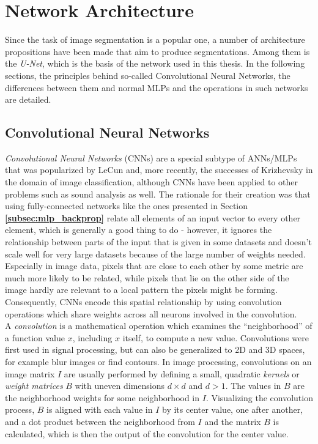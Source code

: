 \chapter {Network Architecture}
\label{chap:network}

Since the task of image segmentation is a popular one, a number of architecture propositions have been made that aim to produce segmentations. Among them is the \textit{U-Net}, which is the basis of the network used in this thesis.  In the following sections, the principles behind so-called Convolutional Neural Networks, the differences between them and normal MLPs and the operations in such networks are detailed.


	\section{Convolutional Neural Networks}
\label{sec:CNN}
\textit{Convolutional Neural Networks} (CNNs) are a special subtype of ANNs/MLPs that was popularized by LeCun \cite{lecun98} and, more recently, the successes of Krizhevsky \cite{krizhevsky2012} in the domain of image classification, although CNNs have been applied to other problems such as sound analysis as well. The rationale for their creation was that using fully-connected networks like the ones presented in Section \textbf{\ref{subsec:mlp_backprop}} relate all elements of an input vector to every other element, which is generally a good thing to do - however, it ignores the relationship between parts of the input that is given in some datasets and doesn't scale well for very large datasets because of the large number of weights needed. Especially in image data, pixels that are close to each other by some metric are much more likely to be related, while pixels that lie on the other side of the image hardly are relevant to a local pattern the pixels might be forming. Consequently, CNNs encode this spatial relationship by using convolution operations which share weights across all neurons involved in the convolution.\\

\noindent A \textit{convolution} is a mathematical operation which examines the ``neighborhood'' of a function value $x$, including $x$ itself, to compute a new value.  Convolutions were first used in signal processing, but can also be generalized to 2D and 3D spaces, for example blur images or find contours. In image processing, convolutions on an image matrix $I$ are usually performed by defining a small, quadratic \textit{kernels} or \textit{weight matrices} $B$ with uneven dimensions $d \times d$ and $d > 1$. The values in $B$ are the neighborhood weights for some neighborhood in $I$. Visualizing the convolution process, $B$ is aligned with each value in $I$ by its center value, one after another, and a dot product between the neighborhood from $I$ and the matrix $B$ is calculated, which is then the output of the convolution for the center value.

